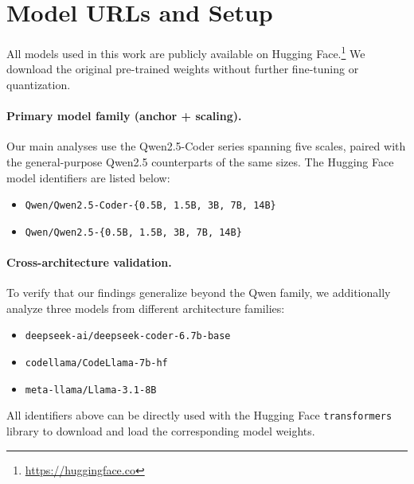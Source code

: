 
\section{Model URLs and Setup}
\label{app:model_urls_and_setup}

All models used in this work are publicly available on Hugging Face.\footnote{\url{https://huggingface.co}} We download the original pre-trained weights without further fine-tuning or quantization.

\paragraph{Primary model family (anchor + scaling).}
Our main analyses use the Qwen2.5-Coder series \citep{hui2024qwen25coder} spanning five scales, paired with the general-purpose Qwen2.5 counterparts \citep{yang2024qwen25} of the same sizes. The Hugging Face model identifiers are listed below:

\begin{itemize}
  \item \texttt{Qwen/Qwen2.5-Coder-\{0.5B, 1.5B, 3B, 7B, 14B\}}
  \item \texttt{Qwen/Qwen2.5-\{0.5B, 1.5B, 3B, 7B, 14B\}}
\end{itemize}

\paragraph{Cross-architecture validation.}
To verify that our findings generalize beyond the Qwen family, we additionally analyze three models from different architecture families:

\begin{itemize}
  \item \texttt{deepseek-ai/deepseek-coder-6.7b-base} \citep{guo2024deepseekcoder}
  \item \texttt{codellama/CodeLlama-7b-hf} \citep{roziere2023codellama}
  \item \texttt{meta-llama/Llama-3.1-8B} \citep{llama3team2024}
\end{itemize}

All identifiers above can be directly used with the Hugging Face \texttt{transformers} library to download and load the corresponding model weights.
